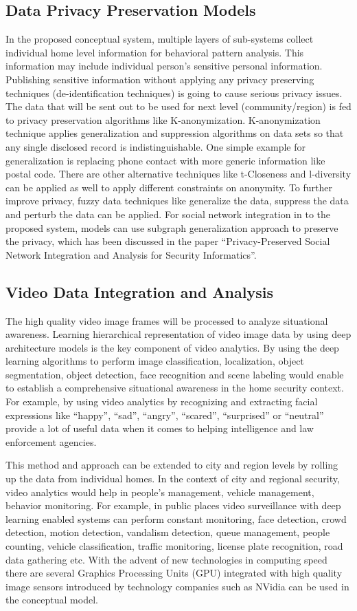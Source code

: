 \documentclass[sigconf]{acmart}
\begin{document}
\subsection{Data Privacy Preservation Models}
In the proposed conceptual system, multiple layers of sub-systems collect individual home level information for behavioral pattern analysis. This information may include individual person's sensitive personal information. Publishing sensitive information without applying any privacy preserving techniques (de-identification techniques) is going to cause serious privacy issues. The data that will be sent out to be used for next level (community/region) is fed to privacy preservation algorithms like K-anonymization. K-anonymization technique applies generalization and suppression algorithms on data sets so that any single disclosed record is indistinguishable. One simple example for generalization is replacing phone contact with more generic information like postal code. There are other alternative techniques like t-Closeness and l-diversity can be applied as well to apply different constraints on anonymity. To further improve privacy, fuzzy data techniques like generalize the data, suppress the data and perturb the data can be applied. For social network integration in to the proposed system, models can use subgraph generalization approach to preserve the privacy, which has been discussed in the paper ``Privacy-Preserved Social Network Integration and Analysis for Security Informatics''.

\subsection{Video Data Integration and Analysis}
The high quality video image frames will be processed to analyze situational awareness. Learning hierarchical representation of video image data by using deep architecture models is the key component of video analytics. By using the deep learning algorithms to perform image classification, localization, object segmentation, object detection, face recognition and scene labeling would enable to establish a comprehensive situational awareness in the home security context. For example, by using video analytics by recognizing  and extracting facial expressions like ``happy'', ``sad'', ``angry'', ``scared'', ``surprised'' or ``neutral''  provide a lot of useful data when it comes to helping intelligence and law enforcement agencies. 

This method and approach can be extended to city and region levels by rolling up the data from individual homes. In the context of city and regional security, video analytics would help in people's management, vehicle management, behavior monitoring. For example, in public places video surveillance with deep learning enabled systems can perform constant monitoring, face detection, crowd detection, motion detection, vandalism detection, queue management, people counting, vehicle classification, traffic monitoring, license plate recognition, road data gathering etc. With the advent of new technologies in computing speed there are several Graphics Processing Units (GPU) integrated with high quality image sensors  introduced by technology companies such as NVidia can be used in the conceptual model.
\end{document}
